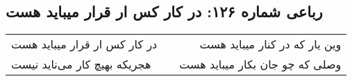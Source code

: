 \begin{center}
\section*{رباعی شماره ۱۲۶: در کار کس ار قرار میباید هست}
\label{sec:sh126}
\begin{longtable}{l p{0.5cm} r}
در کار کس ار قرار میباید هست
&&
وین یار که در کنار میباید هست
\\
هجریکه بهیچ کار می‌ناید نیست
&&
وصلی که چو جان بکار میباید هست
\\
\end{longtable}
\end{center}
